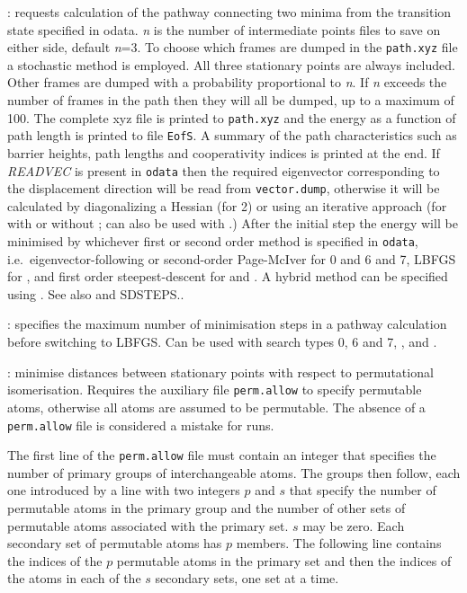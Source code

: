 {{{: requests calculation of the pathway connecting two minima from the transition
state specified in odata. {\it n\/} is the number of intermediate points files to save on either
side, default {\it n\/}=3. 
To choose which frames are dumped in the {\tt path.xyz} file a stochastic method is employed.
All three stationary points are always included. 
Other frames are dumped with a probability proportional to {\it n\/}. 
If {\it n\/} exceeds the number of frames in the path then they will all be dumped, up to a 
maximum of 100.
The complete xyz file is printed to {\tt path.xyz} and the energy as a function of
path length is printed to file {\tt EofS}. A summary of the path characteristics such as barrier heights,
path lengths and cooperativity indices is printed at the end. If {\it READVEC\/} is present in
{\tt odata} then the required eigenvector corresponding to the displacement direction will
be read from {\tt vector.dump}, otherwise it will be calculated by diagonalizing a Hessian (for
{ 2\/}) or using an iterative approach (for {} with or without 
{}; {} can also be used with {}.) 
After the initial step the energy will be minimised by whichever first or second
order method is specified in {\tt odata}, i.e.~eigenvector-following or second-order Page-McIver
for { 0\/} and 6 and 7, LBFGS for {}, and first order steepest-descent
for {} and {}. 
A hybrid method can be specified using {}.
See also {} and {SDSTEPS\/.}.

: specifies the maximum number of minimisation steps
in a pathway calculation before switching to LBFGS. Can be used with search types
 0, 6 and 7, {}, {} and {}.

: minimise distances between stationary points with respect to
permutational isomerisation.
Requires the auxiliary file {\tt perm.allow} to specify permutable atoms, otherwise
all atoms are assumed to be permutable. The absence of a {\tt perm.allow}
file is considered a mistake for  runs.

The first line of the {\tt perm.allow} file must contain an integer
that specifies the number of primary groups of interchangeable atoms.
The groups then follow, each one introduced by a line with two integers $p$ and $s$
that specify the number of permutable atoms in the primary group and the number of other sets
of permutable atoms associated with the primary set.
$s$ may be zero.
Each secondary set of permutable atoms has $p$ members.
The following line contains the indices of the $p$ permutable atoms 
in the primary set and then
the indices of the atoms in each of the $s$ secondary sets, one set at 
a time.

}}}
